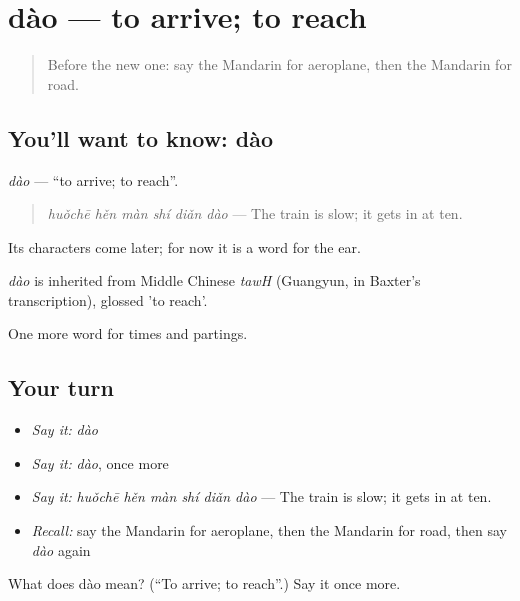 \section[dào]{dào — to arrive; to reach}

\label{lesson:ZH-C72-dao}



\begin{quote}
Before the new one: say the Mandarin for aeroplane, then the Mandarin for road.
\end{quote}

\subsection*{You'll want to know: dào}
\emph{dào} — \textquotedblleft{}to arrive; to reach\textquotedblright{}.

\begin{quote}
\emph{huǒchē hěn màn shí diǎn dào} — The train is slow; it gets in at ten.
\end{quote}

Its characters come later; for now it is a word for the ear.

\begin{cousinweb}
\emph{dào} is inherited from Middle Chinese \emph{tawH} (Guangyun, in Baxter's transcription), glossed 'to reach'.
\end{cousinweb}

\begin{grammarlens}[title={What you've built}]
One more word for times and partings.
\end{grammarlens}

\subsection*{Your turn}
\begin{itemize}
\raggedright
  \item \emph{Say it:} \emph{dào}
  \item \emph{Say it:} \emph{dào}, once more
  \item \emph{Say it:} \emph{huǒchē hěn màn shí diǎn dào} — The train is slow; it gets in at ten.
  \item \emph{Recall:} say the Mandarin for aeroplane, then the Mandarin for road, then say \emph{dào} again
\end{itemize}

\begin{tcolorbox}[breakable,colback=teal!4,colframe=teal!35!black,title={Before you move on}]
What does dào mean? (\textquotedblleft{}To arrive; to reach\textquotedblright{}.) Say it once more.
\end{tcolorbox}
